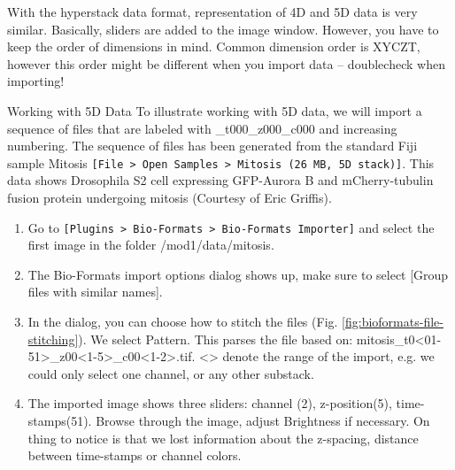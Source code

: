 With the hyperstack data format, representation of 4D and 5D data is very similar. Basically, sliders are added to the image window. However, you have to keep the order of dimensions in mind. Common dimension order is XYCZT, however this order might be different when you import data -- doublecheck when importing!

\begin{taskbox}{Working with 5D Data}
To illustrate working with 5D data, we will import a sequence of files that are labeled with \_t000\_z000\_c000 and increasing numbering. The sequence of files has been generated from the standard Fiji sample Mitosis \texttt{[File > Open Samples > Mitosis (26 MB, 5D stack)]}. This data shows Drosophila S2 cell expressing GFP-Aurora B and mCherry-tubulin fusion protein undergoing mitosis (Courtesy of Eric Griffis).

\begin{enumerate}
	\item Go to \texttt{[Plugins > Bio-Formats > Bio-Formats Importer]} and select the first image in the folder /mod1/data/mitosis.
	\item The Bio-Formats import options dialog shows up, make sure to select [Group files with similar names].
	\item In the dialog, you can choose how to stitch the files (Fig. \ref{fig:bioformats-file-stitching}). We select Pattern. This parses the file based on: mitosis\_t0<01-51>\_z00<1-5>\_c00<1-2>.tif. <> denote the range of the import, e.g. we could only select one channel, or any other substack.
	
	\begin{minipage}[t]{\linewidth}
		\begin{center}
		\medskip
		\label{fig:bioformats-file-stitching}
		\end{center}
	\end{minipage}
	
	\item The imported image shows three sliders: channel (2), z-position(5), time-stamps(51). Browse through the image, adjust Brightness if necessary. On thing to notice is that we lost information about the z-spacing, distance between time-stamps or channel colors.
\end{enumerate}

\end{taskbox}

